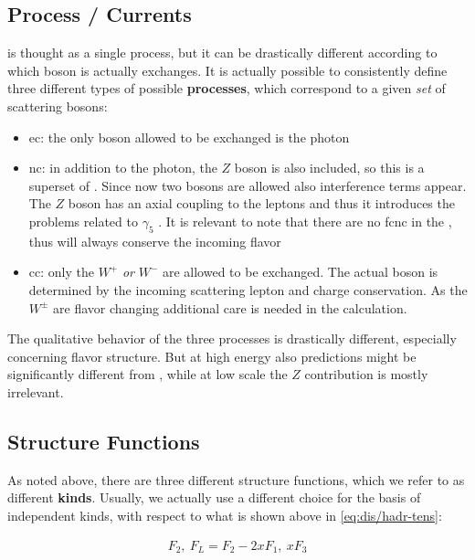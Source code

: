 \subsection{Process / Currents}

\dis is thought as a single process, but it can be drastically different
according to which \ew boson is actually exchanges.
It is actually possible to consistently define three different types of
possible \textbf{processes}, which correspond to a given \textit{set} of
scattering bosons:

\begin{itemize}
  \item \acrfull{ec}: the only boson allowed to be exchanged is the photon
  \item \acrfull{nc}: in addition to the photon, the $Z$ boson is also
    included, so this is a superset of \ec.
    Since now two bosons are allowed also interference terms appear.
    The $Z$ boson has an axial coupling to the leptons and thus it introduces
    the problems related to $\gamma_5$ \cite{Gnendiger:2017pys}.
    It is relevant to note that there are no \acrfull{fcnc} in the \sm, thus
    \nc will always conserve the incoming flavor
  \item \acrfull{cc}: only the $W^+$ \textit{or} $W^-$ are allowed to be
    exchanged.
    The actual boson is determined by the incoming scattering lepton and charge
    conservation. As the $W^\pm$ are flavor changing additional care is needed
    in the calculation.
\end{itemize}

The qualitative behavior of the three processes is drastically different,
especially \cc concerning flavor structure.
But at high energy also \nc predictions might be significantly different from
\ec, while at low scale the $Z$ contribution is mostly irrelevant.

\subsection{Structure Functions}

As noted above, there are three different structure functions, which we refer
to as different \textbf{kinds}.
Usually, we actually use a different choice for the basis of independent kinds,
with respect to what is shown above in \cref{eq:dis/hadr-tens}:

\begin{align}
    F_2,~ F_L = F_2 - 2xF_1,~ xF_3
\end{align}

